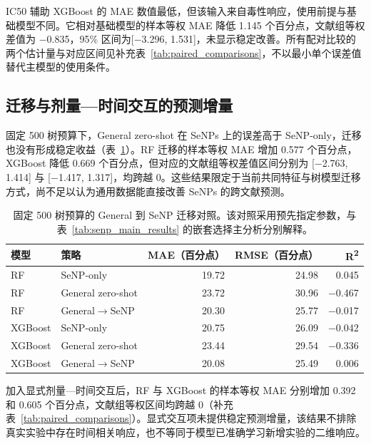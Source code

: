 \documentclass[letterpaper]{article}
\begin{document}
IC50 辅助 XGBoost 的 MAE 数值最低，但该输入来自毒性响应，使用前提与基础模型不同。它相对基础模型的样本等权 MAE 降低 1.145 个百分点，文献组等权差值为 \ensuremath{\mathord{-}}0.835，95\% 区间为[\ensuremath{\mathord{-}}3.296, 1.531]，未显示稳定改善。所有配对比较的两个估计量与对应区间见补充表~\ref{tab:paired_comparisons}，不以最小单个误差值替代主模型的使用条件。

\subsection{迁移与剂量—时间交互的预测增量}

固定 500 树预算下，General zero-shot 在 SeNPs 上的误差高于 SeNP-only，迁移也没有形成稳定收益（表~\ref{tab:transfer_results}）。RF 迁移的样本等权 MAE 增加 0.577 个百分点，XGBoost 降低 0.669 个百分点，但对应的文献组等权差值区间分别为 [\ensuremath{\mathord{-}}2.763, 1.414] 与 [\ensuremath{\mathord{-}}1.417, 1.317]，均跨越 0。这些结果限定于当前共同特征与树模型迁移方式，尚不足以认为通用数据能直接改善 SeNPs 的跨文献预测。

\begin{table}[H]
\centering
\caption{固定 500 树预算的 General 到 SeNP 迁移对照。该对照采用预先指定参数，与表~\ref{tab:senp_main_results} 的嵌套选择主分析分别解释。}
\label{tab:transfer_results}
\small
\begin{tabular}{llrrr}
\toprule
模型 & 策略 & MAE（百分点） & RMSE（百分点） & R\textsuperscript{2} \\
\midrule
RF & SeNP-only & 19.72 & 24.98 & 0.045 \\
RF & General zero-shot & 23.72 & 30.96 & \ensuremath{\mathord{-}}0.467 \\
RF & General\ensuremath{\rightarrow}SeNP & 20.30 & 25.77 & \ensuremath{\mathord{-}}0.017 \\
XGBoost & SeNP-only & 20.75 & 26.09 & \ensuremath{\mathord{-}}0.042 \\
XGBoost & General zero-shot & 23.44 & 29.54 & \ensuremath{\mathord{-}}0.336 \\
XGBoost & General\ensuremath{\rightarrow}SeNP & 20.08 & 25.49 & 0.006 \\
\bottomrule
\end{tabular}

\end{table}

加入显式剂量—时间交互后，RF 与 XGBoost 的样本等权 MAE 分别增加 0.392 和 0.605 个百分点，文献组等权区间均跨越 0（补充表~\ref{tab:paired_comparisons}）。显式交互项未提供稳定预测增量，该结果不排除真实实验中存在时间相关响应，也不等同于模型已准确学习新增实验的二维响应。
\end{document}
